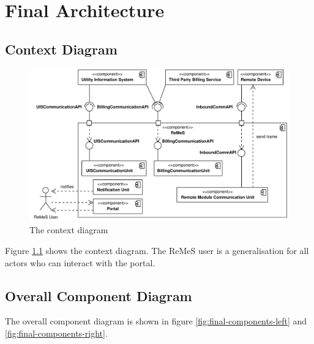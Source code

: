 \chapter{Final Architecture}
\label{chap:final-architecture}

\section{Context Diagram}

\begin{figure}[H]
	\begin{centering}
		\includegraphics[width=\textwidth]{figs/final-context.pdf}
		\caption{The context diagram}
		\label{fig:final-context}
	\end{centering}
\end{figure}

\npar Figure \ref{fig:final-context} shows the context diagram. The ReMeS
user is a generalisation for all actors who can interact with the portal. 

\section{Overall Component Diagram}

\npar The overall component diagram is shown in figure
\ref{fig:final-components-left} and \ref{fig:final-components-right}.

